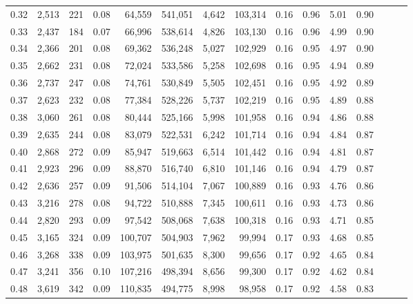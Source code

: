 \begin{tabular}{rrrrrrrrrrrrrrr}
0.32 &   2,513 &    221 &  0.08 &   64,559 &  541,051 &    4,642 &  103,314 &  0.16 &  0.96 &  5.01 &      0.90 \\
0.33 &   2,437 &    184 &  0.07 &   66,996 &  538,614 &    4,826 &  103,130 &  0.16 &  0.96 &  4.99 &      0.90 \\
0.34 &   2,366 &    201 &  0.08 &   69,362 &  536,248 &    5,027 &  102,929 &  0.16 &  0.95 &  4.97 &      0.90 \\
0.35 &   2,662 &    231 &  0.08 &   72,024 &  533,586 &    5,258 &  102,698 &  0.16 &  0.95 &  4.94 &      0.89 \\
0.36 &   2,737 &    247 &  0.08 &   74,761 &  530,849 &    5,505 &  102,451 &  0.16 &  0.95 &  4.92 &      0.89 \\
0.37 &   2,623 &    232 &  0.08 &   77,384 &  528,226 &    5,737 &  102,219 &  0.16 &  0.95 &  4.89 &      0.88 \\
0.38 &   3,060 &    261 &  0.08 &   80,444 &  525,166 &    5,998 &  101,958 &  0.16 &  0.94 &  4.86 &      0.88 \\
0.39 &   2,635 &    244 &  0.08 &   83,079 &  522,531 &    6,242 &  101,714 &  0.16 &  0.94 &  4.84 &      0.87 \\
0.40 &   2,868 &    272 &  0.09 &   85,947 &  519,663 &    6,514 &  101,442 &  0.16 &  0.94 &  4.81 &      0.87 \\
0.41 &   2,923 &    296 &  0.09 &   88,870 &  516,740 &    6,810 &  101,146 &  0.16 &  0.94 &  4.79 &      0.87 \\
0.42 &   2,636 &    257 &  0.09 &   91,506 &  514,104 &    7,067 &  100,889 &  0.16 &  0.93 &  4.76 &      0.86 \\
0.43 &   3,216 &    278 &  0.08 &   94,722 &  510,888 &    7,345 &  100,611 &  0.16 &  0.93 &  4.73 &      0.86 \\
0.44 &   2,820 &    293 &  0.09 &   97,542 &  508,068 &    7,638 &  100,318 &  0.16 &  0.93 &  4.71 &      0.85 \\
0.45 &   3,165 &    324 &  0.09 &  100,707 &  504,903 &    7,962 &   99,994 &  0.17 &  0.93 &  4.68 &      0.85 \\
0.46 &   3,268 &    338 &  0.09 &  103,975 &  501,635 &    8,300 &   99,656 &  0.17 &  0.92 &  4.65 &      0.84 \\
0.47 &   3,241 &    356 &  0.10 &  107,216 &  498,394 &    8,656 &   99,300 &  0.17 &  0.92 &  4.62 &      0.84 \\
0.48 &   3,619 &    342 &  0.09 &  110,835 &  494,775 &    8,998 &   98,958 &  0.17 &  0.92 &  4.58 &      0.83 \\

\end{tabular}
